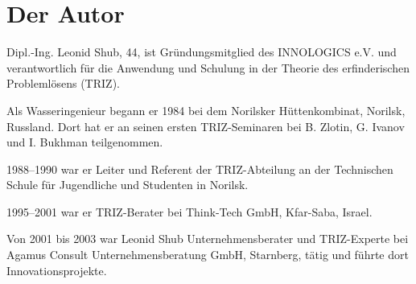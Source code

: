 \documentclass[11pt,a4paper]{article}
\begin{document}
\section*{Der Autor}

Dipl.-Ing. Leonid Shub, 44, ist Gründungsmitglied des INNOLOGICS e.V. und
verantwortlich für die Anwendung und Schulung in der Theorie des
erfinderischen Problemlösens (TRIZ).

Als Wasseringenieur begann er 1984 bei dem Norilsker Hüttenkombinat, Norilsk,
Russland. Dort hat er an seinen ersten TRIZ-Seminaren bei B. Zlotin, G. Ivanov
und I. Bukhman teilgenommen.

1988--1990 war er Leiter und Referent der TRIZ-Abteilung an der Technischen
Schule für Jugendliche und Studenten in Norilsk.

1995--2001 war er TRIZ-Berater bei Think-Tech GmbH, Kfar-Saba, Israel.

Von 2001 bis 2003 war Leonid Shub Unternehmensberater und TRIZ-Experte bei
Agamus Consult Unternehmensberatung GmbH, Starnberg, tätig und führte dort
Innovationsprojekte.
\end{document}
